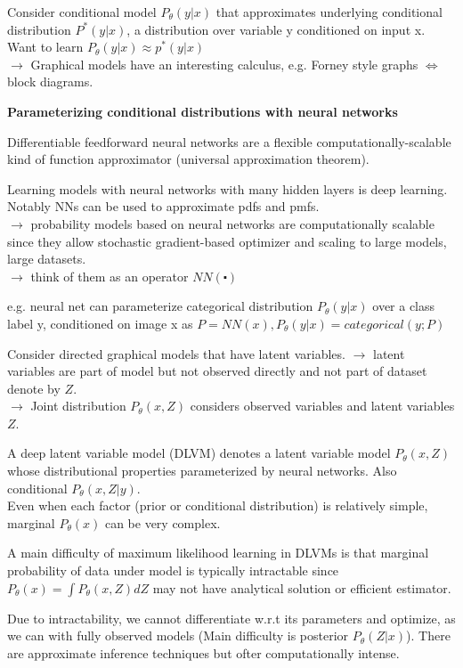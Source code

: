 \documentclass[12pt,a4paper]{article}
\begin{document}
Consider conditional model $P_\theta(y|x)$ that approximates underlying conditional distribution $P^*(y|x)$, a distribution over variable y conditioned on input x. \\
Want to learn $P_\theta(y|x)\approx p^*(y|x)$\\
$\rightarrow$ Graphical models have an interesting calculus, e.g. Forney style graphs $\Leftrightarrow$ block diagrams. 

\textbf{Parameterizing conditional distributions with neural networks}

Differentiable feedforward neural networks are a flexible computationally-scalable kind of function approximator (universal approximation theorem). 

Learning models with neural networks with many hidden layers is deep learning. 
Notably NNs can be used to approximate pdfs and pmfs. \\
$\rightarrow$ probability models based on neural networks are computationally scalable since they allow stochastic gradient-based optimizer and scaling to large models, large datasets. \\ 
$\rightarrow$ think of them as an operator $NN(\centerdot)$

e.g. neural net can parameterize categorical distribution $P_\theta(y|x)$ over a class label y, conditioned on image x as $P=NN(x),P_\theta(y|x)=categorical(y;P)$

\vspace{0.5cm}
Consider directed graphical models that have latent variables.
$\rightarrow$ latent variables are part of model but not observed directly and not part of dataset denote by $Z$. \\
$\rightarrow$ Joint distribution $P_\theta(x,Z)$ considers observed variables and latent variables $Z$. 

A deep latent variable model (DLVM) denotes a latent variable model $P_\theta(x,Z)$ whose distributional properties parameterized by neural networks. Also conditional $P_\theta(x,Z|y)$. \\
Even when each factor (prior or conditional distribution) is relatively simple, marginal $P_\theta(x)$ can be very complex. 

A main difficulty of maximum likelihood learning in DLVMs is that marginal probability of data under model is typically intractable since $P_\theta(x)=\int P_\theta(x,Z)dZ$ may not have analytical solution or efficient estimator. 

Due to intractability, we cannot differentiate w.r.t its parameters and optimize, as we can with fully observed models (Main difficulty is posterior $P_\theta(Z|x)$). There are approximate inference techniques but ofter computationally intense. 
\end{document}
